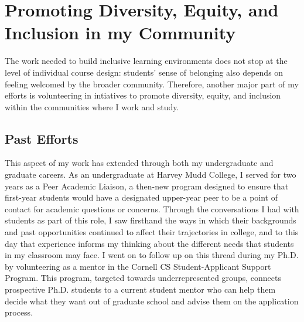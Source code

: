 \documentclass[12pt,letterpaper]{article}
\begin{document}

\section{Promoting Diversity, Equity, and Inclusion in my Community}
The work needed to build inclusive learning environments does not stop at the level of individual course design: students' sense of belonging also depends on feeling welcomed by the broader community.
Therefore, another major part of my efforts is volunteering in intiatives to promote diversity, equity, and inclusion within the communities where I work and study. 

\subsection{Past Efforts}
This aspect of my work has extended through both my undergraduate and graduate careers.
As an undergraduate at Harvey Mudd College, I served for two years as a Peer Academic Liaison, a then-new program designed to ensure that first-year students would have a designated upper-year peer to be a point of contact for academic questions or concerns.
Through the conversations I had with students as part of this role, I saw firsthand the ways in which their backgrounds and past opportunities continued to affect their trajectories in college, and to this day that experience informs my thinking about the different needs that students in my classroom may face.
I went on to follow up on this thread during my Ph.D. by volunteering as a mentor in the Cornell CS Student-Applicant Support Program.
This program, targeted towards underrepresented groups, connects prospective Ph.D. students to a current student mentor who can help them decide what they want out of graduate school and advise them on the application process.
\end{document}
